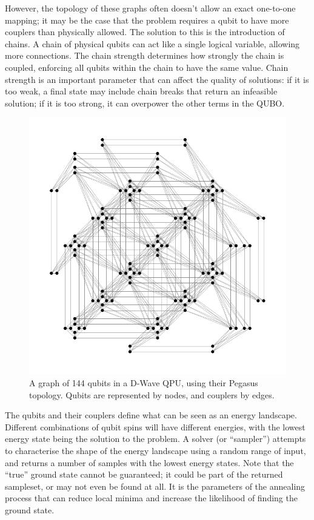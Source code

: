 \documentclass[aps,pra,10pt,twocolumn]{revtex4-2}
\begin{document}
However, the topology of these graphs often doesn't allow an exact one-to-one mapping; it may be the case that the problem requires a qubit to have more couplers than physically allowed. The solution to this is the introduction of chains. A chain of physical qubits can act like a single logical variable, allowing more connections. The chain strength determines how strongly the chain is coupled, enforcing all qubits within the chain to have the same value. Chain strength is an important parameter that can affect the quality of solutions: if it is too weak, a final state may include chain breaks that return an infeasible solution; if it is too strong, it can overpower the other terms in the QUBO.

\begin{figure}[b]
    \centering
    \includegraphics[width=\linewidth]{../Figures/pegasus.pdf}
    \caption{A graph of 144 qubits in a D-Wave QPU, using their Pegasus topology. Qubits are represented by nodes, and couplers by edges.}
    \label{fig:pegasus}
\end{figure}

The qubits and their couplers define what can be seen as an energy landscape. Different combinations of qubit spins will have different energies, with the lowest energy state being the solution to the problem. A solver (or ``sampler'') attempts to characterise the shape of the energy landscape using a random range of input, and returns a number of samples with the lowest energy states. Note that the ``true'' ground state cannot be guaranteed; it could be part of the returned sampleset, or may not even be found at all. It is the parameters of the annealing process that can reduce local minima and increase the likelihood of finding the ground state.
\end{document}
